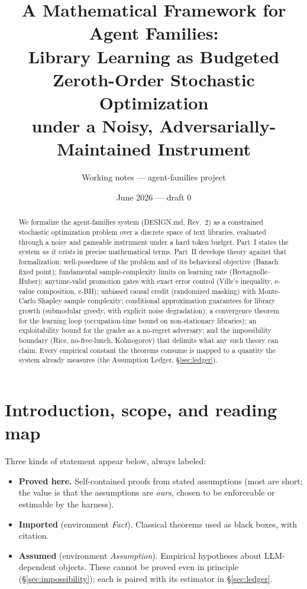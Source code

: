 \documentclass[11pt]{article}
\title{A Mathematical Framework for Agent Families:\\
\large Library Learning as Budgeted Zeroth-Order Stochastic Optimization\\
under a Noisy, Adversarially-Maintained Instrument}
\author{Working notes --- agent-families project}
\date{June 2026 --- draft 0}
\theoremstyle{plain}
\theoremstyle{definition}
\theoremstyle{remark}
\begin{document}
\maketitle

\begin{abstract}
We formalize the agent-families system (DESIGN.md, Rev.~2) as a constrained
stochastic optimization problem over a discrete space of text libraries,
evaluated through a noisy and gameable instrument under a hard token budget.
Part~I states the system \emph{as it exists} in precise mathematical terms.
Part~II develops theory against that formalization: well-posedness of the
problem and of its behavioral objective (Banach fixed point); fundamental
sample-complexity limits on learning rate (Bretagnolle--Huber); anytime-valid
promotion gates with exact error control (Ville's inequality, e-value
composition, e-BH); unbiased causal credit (randomized masking) with
Monte-Carlo Shapley sample complexity; conditional approximation guarantees for
library growth (submodular greedy, with explicit noise degradation);
a convergence theorem for the learning loop (occupation-time bound on
non-stationary libraries); an exploitability bound for the grader as a
no-regret adversary; and the impossibility boundary (Rice, no-free-lunch,
Kolmogorov) that delimits what any such theory can claim. Every empirical
constant the theorems consume is mapped to a quantity the system already
measures (the Assumption Ledger, \S\ref{sec:ledger}).
\end{abstract}

\tableofcontents

\section{Introduction, scope, and reading map}

Three kinds of statement appear below, always labeled:
\begin{itemize}[leftmargin=2em]
  \item \textbf{Proved here.} Self-contained proofs from stated assumptions
        (most are short; the value is that the assumptions are \emph{ours},
        chosen to be enforceable or estimable by the harness).
  \item \textbf{Imported} (environment \emph{Fact}). Classical theorems used as
        black boxes, with citation.
  \item \textbf{Assumed} (environment \emph{Assumption}). Empirical hypotheses
        about LLM-dependent objects. These cannot be proved even in principle
        (\S\ref{sec:impossibility}); each is paired with its estimator in
        \S\ref{sec:ledger}.
\end{itemize}
\end{document}
